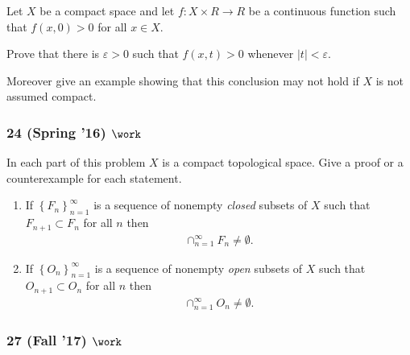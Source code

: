 \begin{problem}[?]

Let \(X\) be a compact space and let \(f : X \times R \to R\) be a
continuous function such that \(f (x, 0) > 0\) for all \(x \in X\).

Prove that there is \(\varepsilon> 0\) such that \(f (x, t) > 0\)
whenever \({\left\lvert {t} \right\rvert} < \varepsilon\).

Moreover give an example showing that this conclusion may not hold if
\(X\) is not assumed compact.

\end{problem}

\hypertarget{spring-16-work}{%
\subsubsection{\texorpdfstring{24 (Spring '16)
\(\work\)}{24 (Spring '16) \textbackslash work}}\label{spring-16-work}}

\begin{problem}[?]

In each part of this problem \(X\) is a compact topological space. Give
a proof or a counterexample for each statement.

\begin{enumerate}
\def\labelenumi{\alph{enumi}.}
\item
  If \(\left\{{F_n }\right\}_{n=1}^\infty\) is a sequence of nonempty
  \emph{closed} subsets of \(X\) such that \(F_{n+1} \subset F_{n}\) for
  all \(n\) then
  \begin{align*}\cap^\infty_{n=1} F_n\neq \emptyset.\end{align*}
\item
  If \(\left\{{O_n}\right\}_{n=1}^\infty\) is a sequence of nonempty
  \emph{open} subsets of \(X\) such that \(O_{n+1} \subset O_n\) for all
  \(n\) then
  \begin{align*}\cap_{n=1}^\infty O_{n}\neq \emptyset.\end{align*}
\end{enumerate}

\end{problem}

\hypertarget{fall-17-work-1}{%
\subsubsection{\texorpdfstring{27 (Fall '17)
\(\work\)}{27 (Fall '17) \textbackslash work}}\label{fall-17-work-1}}

